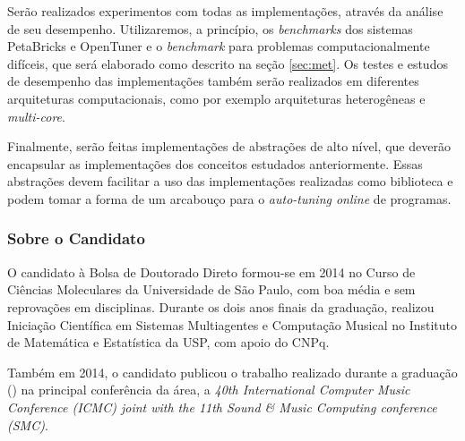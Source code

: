 \documentclass[a4paper, 12pt]{article}
\begin{document}
Serão realizados experimentos com todas as implementações, através da análise
de seu desempenho. Utilizaremos, a princípio, os \emph{benchmarks} dos sistemas
PetaBricks e OpenTuner e o \emph{benchmark} para problemas computacionalmente
difíceis, que será elaborado como descrito na seção \ref{sec:met}.
Os testes e estudos de desempenho das implementações também serão realizados
em diferentes arquiteturas computacionais, como por exemplo arquiteturas
heterogêneas e \emph{multi-core}.

Finalmente, serão feitas implementações de abstrações de alto
nível, que deverão encapsular as implementações dos conceitos estudados
anteriormente. Essas abstrações devem facilitar a uso das implementações
realizadas como biblioteca e podem tomar a forma de um arcabouço para o
\emph{auto-tuning online} de programas.

\subsubsection{Sobre o Candidato}

O candidato à Bolsa de Doutorado Direto formou-se em 2014 no Curso de Ciências
Moleculares da Universidade de São Paulo, com boa média e sem reprovações em
disciplinas. Durante os dois anos finais da graduação, realizou Iniciação
Científica em Sistemas Multiagentes e Computação Musical no Instituto de
Matemática e Estatística da USP, com apoio do CNPq.

Também em 2014, o candidato publicou o trabalho realizado durante a graduação
(\citet{bruel2014protocol}) na principal conferência da área, a
\emph{40th International Computer Music Conference (ICMC) joint with the
11th Sound \& Music Computing conference (SMC)}.
\end{document}
